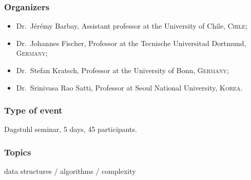 \documentclass[a4paper,10pt]{article}
\begin{document}
\subsubsection*{ Organizers} 
\begin{itemize}
\item Dr.\ J\'er\'emy Barbay, Assistant professor at the University of Chile, \textsc{Chile};
\item Dr.\ Johannes Fischer, Professor at the Tecnische Universitad Dortmund, \textsc{Germany};
\item Dr.\ Stefan Kratsch,  Professor at the University of Bonn, \textsc{Germany};
\item Dr.\ Srinivasa Rao Satti, Professor at Seoul National  University,  \textsc{Korea}.
\end{itemize}

\subsubsection*{Type of event}
Dagstuhl seminar, 5 days, 45 participants. 


\subsubsection*{Topics}


    data structures / algorithms / complexity
\end{document}
